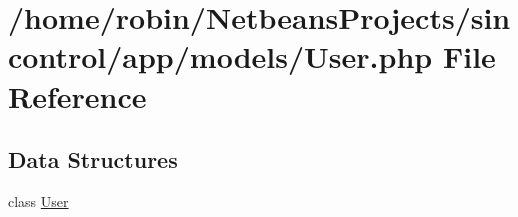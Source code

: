 \hypertarget{_user_8php}{}\section{/home/robin/\+Netbeans\+Projects/sincontrol/app/models/\+User.php File Reference}
\label{_user_8php}
\subsection*{Data Structures}
\begin{DoxyCompactItemize}
\item 
class \hyperlink{class_user}{User}
\end{DoxyCompactItemize}
